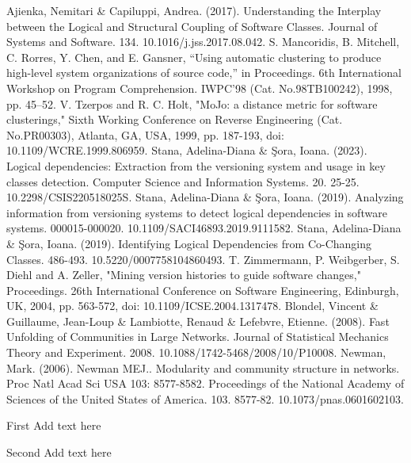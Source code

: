 \documentclass{ieeeaccess}
\begin{document}
\begin{thebibliography}{00}

 Ajienka, Nemitari \& Capiluppi, Andrea. (2017). Understanding the Interplay between the Logical and Structural Coupling of Software Classes. Journal of Systems and Software. 134. 10.1016/j.jss.2017.08.042.
 S. Mancoridis, B. Mitchell, C. Rorres, Y. Chen, and E. Gansner, “Using automatic clustering to produce high-level system organizations of source code,” in Proceedings. 6th International Workshop on Program Comprehension. IWPC’98 (Cat. No.98TB100242), 1998, pp. 45–52.
 V. Tzerpos and R. C. Holt, "MoJo: a distance metric for software clusterings," Sixth Working Conference on Reverse Engineering (Cat. No.PR00303), Atlanta, GA, USA, 1999, pp. 187-193, doi: 10.1109/WCRE.1999.806959.
 Stana, Adelina-Diana \& Şora, Ioana. (2023). Logical dependencies: Extraction from the versioning system and usage in key classes detection. Computer Science and Information Systems. 20. 25-25. 10.2298/CSIS220518025S. 
 Stana, Adelina-Diana \& Şora, Ioana. (2019). Analyzing information from versioning systems to detect logical dependencies in software systems. 000015-000020. 10.1109/SACI46893.2019.9111582. 
 Stana, Adelina-Diana \& Şora, Ioana. (2019). Identifying Logical Dependencies from Co-Changing Classes. 486-493. 10.5220/0007758104860493. 
 T. Zimmermann, P. Weibgerber, S. Diehl and A. Zeller, "Mining version histories to guide software changes," Proceedings. 26th International Conference on Software Engineering, Edinburgh, UK, 2004, pp. 563-572, doi: 10.1109/ICSE.2004.1317478.
 Blondel, Vincent \& Guillaume, Jean-Loup \& Lambiotte, Renaud \& Lefebvre, Etienne. (2008). Fast Unfolding of Communities in Large Networks. Journal of Statistical Mechanics Theory and Experiment. 2008. 10.1088/1742-5468/2008/10/P10008. 
 Newman, Mark. (2006). Newman MEJ.. Modularity and community structure in networks. Proc Natl Acad Sci USA 103: 8577-8582. Proceedings of the National Academy of Sciences of the United States of America. 103. 8577-82. 10.1073/pnas.0601602103. 


\end{thebibliography}

\begin{IEEEbiographynophoto}{First} Add text here
\end{IEEEbiographynophoto}

\begin{IEEEbiographynophoto}{Second} Add text here
\end{IEEEbiographynophoto}

\EOD
\end{document}
